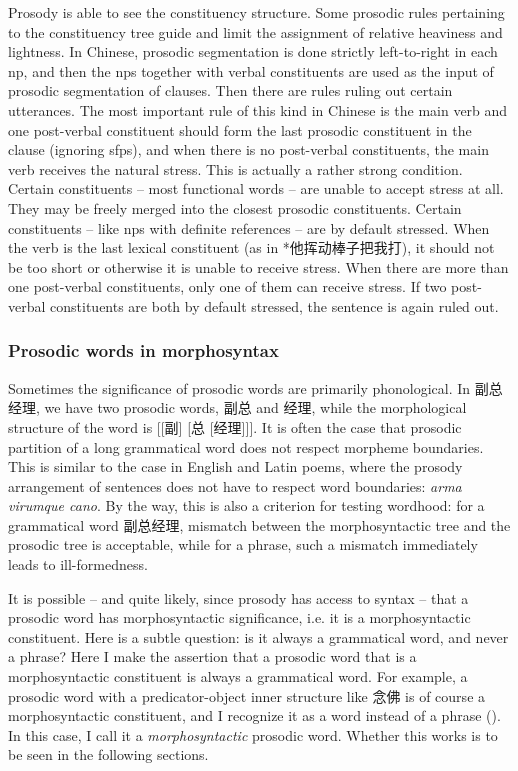 \documentclass[UTF8, a4paper, oneside, scheme=plain]{ctexrep}
\newcommand{\corpus}[1]{\emph{#1}}
\begin{document}
Prosody is able to see the constituency structure.
Some prosodic rules pertaining to the constituency tree 
guide and limit the assignment of relative heaviness and lightness.
In Chinese, prosodic segmentation is done strictly left-to-right 
in each \ac{np},
and then the \ac{np}s together with verbal constituents 
are used as the input of prosodic segmentation of clauses.
Then there are rules ruling out certain utterances.
The most important rule of this kind in Chinese is
the main verb and one post-verbal constituent
should form the last prosodic constituent in the clause (ignoring \ac{sfp}s),
and when there is no post-verbal constituents,
the main verb receives the natural stress. 
This is actually a rather strong condition.
Certain constituents -- most functional words -- are unable to accept stress at all.
They may be freely merged into the closest prosodic constituents.
Certain constituents -- like \ac{np}s with definite references -- are by default stressed.
When the verb is the last lexical constituent
(as in *他挥动棒子把我打),
it should not be too short or otherwise it is unable to receive stress.
When there are more than one post-verbal constituents,
only one of them can receive stress.
If two post-verbal constituents are both by default stressed,
the sentence is again ruled out. %

\subsubsection{Prosodic words in morphosyntax}\label{sec:prosodic-word-syntax}

Sometimes the significance of prosodic words are primarily phonological.
In 副总经理,
we have two prosodic words,
副总 and 经理,
while the morphological structure of the word is [[副] [总 [经理]]].
It is often the case that 
prosodic partition of a long grammatical word 
does not respect morpheme boundaries.
This is similar to the case in English and Latin poems,
where the prosody arrangement of sentences does not have to respect word boundaries:
\corpus{arma vi\textbar rumque ca\textbar no}.
By the way, this is also a criterion for testing wordhood:
for a grammatical word 副总经理,
mismatch between the morphosyntactic tree and the prosodic tree is acceptable,
while for a phrase,
such a mismatch immediately leads to ill-formedness.

It is possible
-- and quite likely, since prosody has access to syntax --
that a prosodic word has morphosyntactic significance, 
i.e. it is a morphosyntactic constituent.
Here is a subtle question:
is it always a grammatical word,
and never a phrase?
Here I make the assertion that a prosodic word that is a morphosyntactic constituent
is always a grammatical word.
For example, a prosodic word with a predicator-object inner structure 
like 念佛 is of course a morphosyntactic constituent,
and I recognize it as a word instead of a phrase 
().
In this case, I call it a \emph{morphosyntactic} prosodic word.
Whether this works is to be seen in the following sections.
\end{document}
